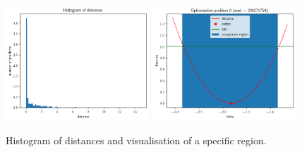 \begin{figure}[h]
    \begin{center}
      \includegraphics[width=0.48\textwidth]{./latex_files/images/chapter3/example_theta_dist.png}
      \includegraphics[width=0.48\textwidth]{./latex_files/images/chapter3/example_region.png}
    \end{center}
  \caption[Histogram of distances at the 1D example.]{Histogram of distances and visualisation of a specific region.}
  \label{fig:example_training_hist}
\end{figure}
